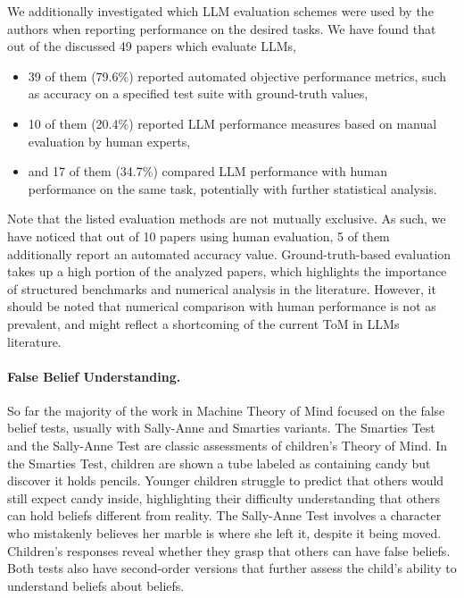 We additionally investigated which LLM evaluation schemes were used by the authors when reporting performance on the desired tasks. We have found that out of the discussed 49 papers which evaluate LLMs,
\vspace{-0.5em}
\begin{itemize}
\itemsep-0.3em
    \item 39 of them (79.6\%) reported automated objective performance metrics, such as accuracy on a specified test suite with ground-truth values,
    \item 10 of them (20.4\%) reported LLM performance measures based on manual evaluation by human experts,
    \item and 17 of them (34.7\%) compared LLM performance with human performance on the same task, potentially with further statistical analysis.
\end{itemize}
Note that the listed evaluation methods are not mutually exclusive. As such, we have noticed that out of 10 papers using human evaluation, 5 of them additionally report an automated accuracy value. Ground-truth-based evaluation takes up a high portion of the analyzed papers, which highlights the importance of structured benchmarks and numerical analysis in the literature. However, it should be noted that numerical comparison with human performance is not as prevalent, and might reflect a shortcoming of the current ToM in LLMs literature.

\paragraph{False Belief Understanding.} So far the majority of the work in Machine Theory of Mind focused on the false belief tests, usually with Sally-Anne \cite{BARONCOHEN198537} and Smarties \cite{gopnik1988childrens} variants. The Smarties Test and the Sally-Anne Test are classic assessments of children's Theory of Mind. In the Smarties Test, children are shown a tube labeled as containing candy but discover it holds pencils. Younger children struggle to predict that others would still expect candy inside, highlighting their difficulty understanding that others can hold beliefs different from reality. The Sally-Anne Test involves a character who mistakenly believes her marble is where she left it, despite it being moved. Children's responses reveal whether they grasp that others can have false beliefs. Both tests also have second-order versions that further assess the child's ability to understand beliefs about beliefs. 

